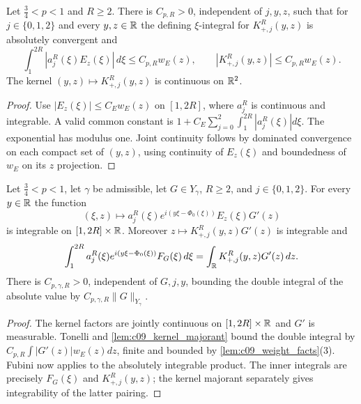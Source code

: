 \begin{lemma}
  \label{lem:c09_kernel_majorant}
  Let $\frac34<p<1$ and $R\ge2$. There is $C_{p,R}>0$, independent of $j,y,z$, such that for
  $j\in\{0,1,2\}$ and every $y,z\in\mathbb{R}$ the defining $\xi$-integral for $K_{+,j}^R(y,z)$ is absolutely
  convergent and
  \[
    \int_1^{2R}|a_j^R(\xi)E_z(\xi)|\,d\xi\le C_{p,R}w_E(z),\qquad
    |K_{+,j}^R(y,z)|\le C_{p,R}w_E(z).
  \]
  The kernel $(y,z)\mapsto K_{+,j}^R(y,z)$ is continuous on $\mathbb{R}^2$.
\end{lemma}
\begin{proof}
  Use $|E_z(\xi)|\le C_Ew_E(z)$ on $[1,2R]$, where $a_j^R$ is continuous and integrable.
  A valid common constant is $1+C_E\sum_{j=0}^2\int_1^{2R}|a_j^R(\xi)|d\xi$.
  The exponential has modulus one. Joint continuity follows by dominated convergence on each compact
  set of $(y,z)$, using continuity of $E_z(\xi)$ and boundedness of $w_E$ on its $z$ projection.
\end{proof}

\begin{lemma}
  \label{lem:c09_kernel_fubini}
  Let $\frac34<p<1$, let $\gamma$ be admissible, let $G\in Y_\gamma$, $R\ge2$, and $j\in\{0,1,2\}$.
  For every $y\in\mathbb{R}$ the function
  \[
    (\xi,z)\longmapsto a_j^R(\xi)e^{i(y\xi-\Phi_0(\xi))}E_z(\xi)G'(z)
  \]
  is integrable on $[1,2R]\times\mathbb{R}$. Moreover $z\mapsto K_{+,j}^R(y,z)G'(z)$ is integrable and
  \[
    \int_1^{2R}a_j^R(\xi)e^{i(y\xi-\Phi_0(\xi))}F_G(\xi)\,d\xi
    =\int_{\mathbb{R}} K_{+,j}^R(y,z)G'(z)\,dz .
  \]
  There is $C_{p,\gamma,R}>0$, independent of $G,j,y$, bounding the double integral of the absolute
  value by $C_{p,\gamma,R}\|G\|_{Y_\gamma}$.
\end{lemma}
\begin{proof}
  The kernel factors are jointly continuous on $[1,2R]\times\mathbb{R}$ and $G'$ is measurable.
  Tonelli and \cref{lem:c09_kernel_majorant} bound the double integral by
  $C_{p,R}\int|G'(z)|w_E(z)dz$, finite and bounded by \cref{lem:c09_weight_facts}(3).
  Fubini now applies to the absolutely integrable product. The inner integrals are precisely
  $F_G(\xi)$ and $K_{+,j}^R(y,z)$; the kernel majorant separately gives integrability of the latter pairing.
\end{proof}

